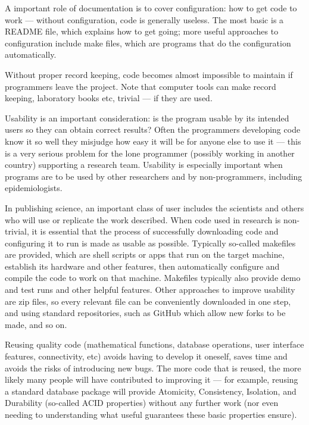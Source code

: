 \documentclass[10pt,a4paper]{article}
\begin{document}
A important role of documentation is to cover configuration: how to get code to work --- without configuration, code is generally useless. The most basic is a README file, which explains how to get going; more useful approaches to configuration include make files, which are programs that do the configuration automatically.

Without proper record keeping, code becomes almost impossible to maintain if programmers leave the project. Note that computer tools can make record keeping, laboratory books etc, trivial --- if they are used.

Usability is an important consideration: \cite{hci1,hci2} is the program usable by its intended users so they can obtain correct results? Often the programmers developing code know it so well they misjudge how easy it will be for anyone else to use it --- this is a very serious problem for the lone programmer (possibly working in another country) supporting a research team. Usability is especially important when programs are to be used by other researchers and by non-programmers, including epidemiologists.

{In publishing science, an important class of user includes the scientists and others who will use or replicate the work described. When code used in research is non-trivial, it is essential that the process of successfully downloading code and configuring it to run is made as usable as possible. Typically so-called makefiles are provided, which are shell scripts or apps that run on the target machine, establish its hardware and other features, then automatically configure and compile the code to work on that machine. Makefiles typically also provide demo and test runs and other helpful features. Other approaches to improve usability are zip files, so every relevant file can be conveniently downloaded in one step, and using standard repositories, such as GitHub which allow new forks to be made, and so on.}

Reusing quality code (mathematical functions, database operations, user interface features, connectivity, etc) avoids having to develop it oneself, saves time and avoids the risks of introducing new bugs. The more code that is reused, the more likely many people will have contributed to improving it --- for example, reusing a standard database package will provide Atomicity, Consistency, Isolation, and Durability (so-called ACID properties) without any further work (nor even needing to understanding what useful guarantees these basic properties ensure). 
\end{document}
